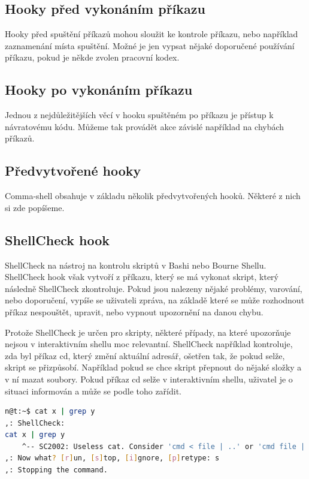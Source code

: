\documentclass[thesis=M,czech]{FITthesis}[2012/06/26]
\begin{document}
\subsection{Hooky před vykonáním příkazu}

Hooky před spuštění příkazů mohou sloužit ke kontrole příkazu, nebo například zaznamenání místa spuštění. Možné je jen vypsat nějaké doporučené používání příkazu, pokud je někde zvolen pracovní kodex.

\subsection{Hooky po vykonáním příkazu}

Jednou z nejdůležitějších věcí v hooku spuštěném po příkazu je přístup k návratovému kódu. Můžeme tak provádět akce závislé například na chybách příkazů.

\subsection{Předvytvořené hooky}

Comma-shell obsahuje v základu několik předvytvořených hooků. Některé z nich si zde popíšeme. 


%
\subsection{ShellCheck hook}

ShellCheck na nástroj na kontrolu skriptů v Bashi nebo Bourne Shellu. ShellCheck hook však vytvoří z příkazu, který se má vykonat skript, který následně ShellCheck zkontroluje. Pokud jsou nalezeny nějaké problémy, varování, nebo doporučení, vypíše se uživateli zpráva, na základě které se může rozhodnout příkaz nespouštět, upravit, nebo vypnout upozornění na danou chybu.

Protože ShellCheck je určen pro skripty, některé případy, na které upozorňuje nejsou v interaktivním shellu moc relevantní. ShellCheck například kontroluje, zda byl příkaz cd, který změní aktuální adresář, ošetřen tak, že pokud selže, skript se přizpůsobí. Například pokud se chce skript přepnout do nějaké složky a v ní mazat soubory. Pokud příkaz cd selže v interaktivním shellu, uživatel je o situaci informován a může se podle toho zařídit.

\begin{minipage}{\linewidth}
\begin{lstlisting}[language=bash, caption={ShellCheck}, label={lst:sccat}]
n@t:~$ cat x | grep y
,: ShellCheck: 
cat x | grep y
    ^-- SC2002: Useless cat. Consider 'cmd < file | ..' or 'cmd file | ..' instead.
,: Now what? [r]un, [s]top, [i]gnore, [p]retype: s
,: Stopping the command.
\end{lstlisting}
\end{minipage}
\end{document}
